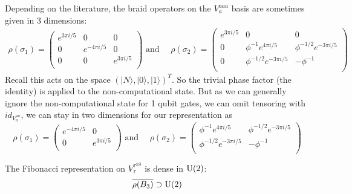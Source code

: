 \documentclass{article}
\begin{document}
Depending on the literature, the braid operators on the $V^{a a a}_{a}$ basis are sometimes given in $3$ dimensions: 
\begin{align*}
  \rho(\sigma_1) = \begin{pmatrix}
    e^{3\pi i / 5} & 0 & 0  \\
    0 & e^{-4 \pi i / 5}  & 0  \\
    0 & 0 & e^{3\pi i / 5}  \\
  \end{pmatrix}  \text{ and } \quad \rho(\sigma_2) = \begin{pmatrix}
    e^{3\pi i / 5} & 0 &  0 \\
    0 & \phi^{-1} e^{4 \pi i / 5} &  \phi^{-1 / 2} e^{-3 \pi i / 5} \\
    0 & \phi^{-1 / 2}e^{-3 \pi i / 5} & -\phi^{-1}  \\
  \end{pmatrix}
\end{align*}
Recall this acts on the space $(\vert N \rangle, \vert 0 \rangle, \vert 1 \rangle)^T$. So the trivial phase factor (the identity) is applied to the non-computational state. But as we can generally ignore the non-computational state for 1 qubit gates, we can omit tensoring with $id_{V^{aa}_{a}}$, we can stay in two dimensions for our representation as
\[
\rho(\sigma_1) = \begin{pmatrix}
    e^{-4 \pi i / 5}  & 0  \\
    0 & e^{3\pi i / 5}  \\
  \end{pmatrix}  \text{ and } \quad \rho(\sigma_2) = \begin{pmatrix}
    \phi^{-1} e^{4 \pi i / 5} &  \phi^{-1 / 2} e^{-3 \pi i / 5} \\
    \phi^{-1 / 2}e^{-3 \pi i / 5} & -\phi^{-1}  \\
  \end{pmatrix}
\]
\begin{thm}
  The Fibonacci representation on $V^{\tau^{\otimes 3}}_{\tau}$ is dense in $\mathrm{U}(2)$:
  \[
    \overline{\rho(B_3)} \supset \mathrm{U}(2)
  \]
\end{thm}
\end{document}
